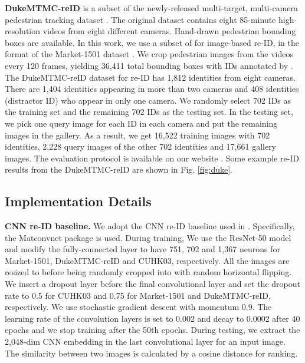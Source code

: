 \documentclass[10pt,twocolumn,letterpaper]{article}
\begin{document}
\textbf{DukeMTMC-reID} is a subset of the newly-released multi-target, multi-camera pedestrian tracking dataset \cite{ristani2016MTMC}. The original dataset contains eight 85-minute high-resolution videos from eight different cameras. Hand-drawn pedestrian bounding boxes are available. In this work, we use a subset of \cite{ristani2016MTMC} for image-based re-ID, in the format of the Market-1501 dataset \cite{zheng2015scalable}. We crop pedestrian images from the videos every 120 frames, yielding 36,411 total bounding boxes with IDs annotated by \cite{ristani2016MTMC}. The DukeMTMC-reID dataset for re-ID  has 1,812 identities from eight cameras. There are 1,404 identities appearing in more than two cameras and 408 identities (distractor ID) who appear in only one camera. We randomly select 702 IDs as the training set and the remaining 702 IDs as the testing set. In the testing set, we pick one query image for each ID in each camera and put the remaining images in the gallery. As a result, we get 16,522 training images with 702 identities, 2,228 query images of the other 702 identities and 17,661 gallery images. The evaluation protocol is available on our website \cite{DukeMTMC-reID}. Some example re-ID results from the DukeMTMC-reID are shown in Fig. \ref{fig:duke}.

\subsection{Implementation Details}\label{sec:details}
\textbf{CNN re-ID baseline.} We adopt the CNN re-ID baseline used in \cite{zheng2016survey,zheng2016person}. Specifically, the Matconvnet \cite{vedaldi15matconvnet} package is used. During training, We use the ResNet-50 model \cite{he2016deep} and modify the fully-connected layer to have 751, 702 and 1,367 neurons for Market-1501, DukeMTMC-reID and CUHK03, respectively. All the images are resized to  before being randomly cropped into  with random horizontal flipping. We insert a dropout layer before the final convolutional layer and set the dropout rate to 0.5 for CUHK03 and 0.75 for Market-1501 and DukeMTMC-reID, respectively. We use stochastic gradient descent with momentum 0.9. The learning rate of the convolution layers is set to 0.002 and decay to 0.0002 after 40 epochs and we stop training after the 50th epochs. During testing, we extract the 2,048-dim CNN embedding in the last convolutional layer for an  input image. The similarity between two images is calculated by a cosine distance for ranking.
\end{document}
